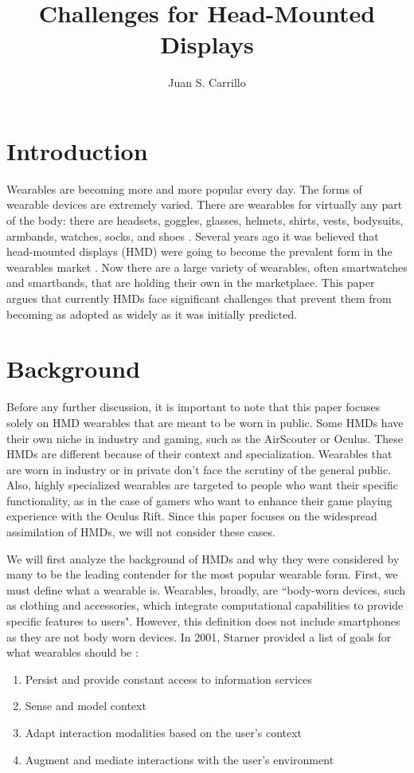 \documentclass[11pt]{article}
\title{Challenges for Head-Mounted Displays}
\author{Juan S. Carrillo}
\begin{document}
\maketitle
\section{Introduction}
Wearables are becoming more and more popular every day. The forms of wearable devices are extremely varied. There are wearables for virtually any part of the body: there are headsets, goggles, glasses, helmets, shirts, vests, bodysuits, armbands, watches, socks, and shoes \cite{VandricoList}. Several years ago it was believed that head-mounted displays (HMD) were going to become the prevalent form in the wearables market \cite{ultimateWearable}. Now there are a large variety of wearables, often smartwatches and smartbands, that are holding their own in the marketplace. This paper argues that currently HMDs face significant challenges that prevent them from becoming as adopted as widely as it was initially predicted.

\section{Background}

Before any further discussion, it is important to note that this paper focuses solely on HMD wearables that are meant to be worn in public. Some HMDs have their own niche in industry and gaming, such as the AirScouter or Oculus. These HMDs are different because of their context and specialization. Wearables that are worn in industry or in private don't face the scrutiny of the general public. Also, highly specialized wearables are targeted to people who want their specific functionality, as in the case of gamers who want to enhance their game playing experience with the Oculus Rift. Since this paper focuses on the widespread assimilation of HMDs, we will not consider these cases.

We will first analyze the background of HMDs and why they were considered by many to be the leading contender for the most popular wearable form. First, we must define what a wearable is. Wearables, broadly, are ``body-worn devices, such as clothing and accessories, which integrate computational capabilities to provide specific features to users"\cite{WearableHumanView}. However, this definition does not include smartphones as they are not body worn devices. In 2001, Starner provided a list of goals for what wearables should be \cite{starnerChallenges1}:
\begin{enumerate}
    \item Persist and provide constant access to information services
    \item Sense and model context
    \item Adapt interaction modalities based on the user's context
    \item Augment and mediate interactions with the user's environment 
\end{enumerate}
\end{document}
